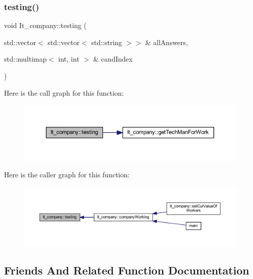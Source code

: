 \subsubsection{\texorpdfstring{testing()}{testing()}}
{\footnotesize\ttfamily void It\+\_\+company\+::testing (\begin{DoxyParamCaption}\item[{std\+::vector$<$ std\+::vector$<$ std\+::string $>$$>$ \&}]{all\+Answers,  }\item[{std\+::multimap$<$ int, int $>$ \&}]{cand\+Index }\end{DoxyParamCaption})\hspace{0.3cm}{\ttfamily [private]}}

Here is the call graph for this function\+:
\nopagebreak
\begin{figure}[H]
\begin{center}
\leavevmode
\includegraphics[width=350pt]{class_it__company_a2c7a94d7f82fb700c0d1f369423ad45f_cgraph}
\end{center}
\end{figure}
Here is the caller graph for this function\+:
\nopagebreak
\begin{figure}[H]
\begin{center}
\leavevmode
\includegraphics[width=350pt]{class_it__company_a2c7a94d7f82fb700c0d1f369423ad45f_icgraph}
\end{center}
\end{figure}


\subsection{Friends And Related Function Documentation}
\hypertarget{class_it__company_a962e1dda6d2c3075501e63a8d62693f7}{}\label{class_it__company_a962e1dda6d2c3075501e63a8d62693f7} 
